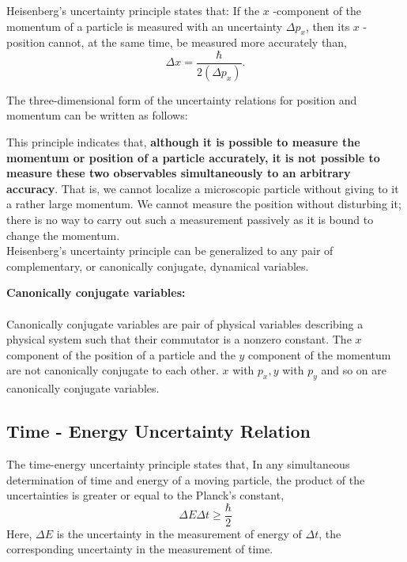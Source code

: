 \begin{definition}
	Heisenberg's uncertainty principle states that: If the $x$ -component of the momentum of a particle is measured with an uncertainty $\Delta p_{x}$, then its $x$ -position cannot, at the same time, be measured more accurately than, $$\Delta x=\frac{\hbar}{2 \left( \Delta p_{x}\right)}  .$$ 
\end{definition}
The three-dimensional form of the uncertainty relations for position and momentum can be written as follows:
\begin{center}
\end{center}
This principle indicates that, \textbf{although it is possible to measure the momentum or position
	of a particle accurately, it is not possible to measure these two observables simultaneously to
	an arbitrary accuracy}. That is, we cannot localize a microscopic particle without giving to it
a rather large momentum. We cannot measure the position without disturbing it; there is no
way to carry out such a measurement passively as it is bound to change the momentum.\\ Heisenberg’s uncertainty principle can be generalized to any pair of complementary, or
canonically conjugate, dynamical variables.
\begin{note}\hspace{0.2cm}\textbf{\large Canonically conjugate variables:}\\\\
	Canonically conjugate variables are pair of physical variables describing a physical system such that their commutator is a nonzero constant. The $ x $
	component of the position of a particle and the $ y $ component of the momentum are not canonically conjugate to
	each other. $ x $ with $ p_x, y $ with $ p_y $ and so on are canonically conjugate variables.
\end{note}
\subsection{Time - Energy Uncertainty Relation}
The time-energy uncertainty principle states that, In any simultaneous determination of time and energy of a moving particle, the product of the uncertainties is greater or equal to the Planck's constant, $$\Delta E \Delta t \geq \frac{\hbar}{2}$$ Here, $\Delta E$ is the uncertainty in the measurement of energy of $\Delta t$, the corresponding uncertainty in the measurement of time.
